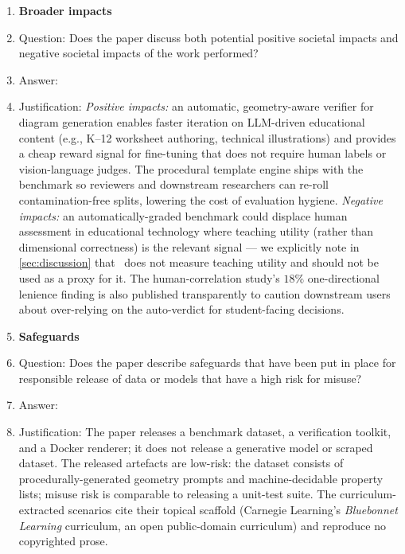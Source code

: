 \begin{enumerate}
\item {\bf Broader impacts}
\item[] Question: Does the paper discuss both potential positive societal impacts and negative societal impacts of the work performed?
\item[] Answer: \answerYes{}
\item[] Justification: \emph{Positive impacts:} an automatic, geometry-aware verifier for diagram generation enables faster iteration on LLM-driven educational content (e.g., K--12 worksheet authoring, technical illustrations) and provides a cheap reward signal for fine-tuning that does not require human labels or vision-language judges. The procedural template engine ships with the benchmark so reviewers and downstream researchers can re-roll contamination-free splits, lowering the cost of evaluation hygiene. \emph{Negative impacts:} an automatically-graded benchmark could displace human assessment in educational technology where teaching utility (rather than dimensional correctness) is the relevant signal --- we explicitly note in \cref{sec:discussion} that \GeoGenBench\ does not measure teaching utility and should not be used as a proxy for it. The human-correlation study's $18\%$ one-directional lenience finding is also published transparently to caution downstream users about over-relying on the auto-verdict for student-facing decisions.

\item {\bf Safeguards}
\item[] Question: Does the paper describe safeguards that have been put in place for responsible release of data or models that have a high risk for misuse?
\item[] Answer: \answerNA{}
\item[] Justification: The paper releases a benchmark dataset, a verification toolkit, and a Docker renderer; it does not release a generative model or scraped dataset. The released artefacts are low-risk: the dataset consists of procedurally-generated geometry prompts and machine-decidable property lists; misuse risk is comparable to releasing a unit-test suite. The curriculum-extracted scenarios cite their topical scaffold (Carnegie Learning's \emph{Bluebonnet Learning} curriculum, an open public-domain curriculum) and reproduce no copyrighted prose.


\end{enumerate}

